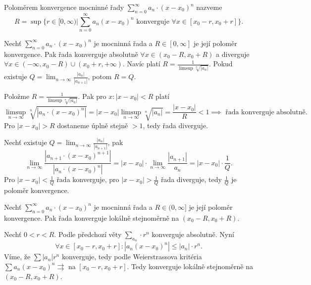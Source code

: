 \documentclass[12pt]{article}					%
\begin{document}
	\begin{definice}
		Poloměrem konvergence mocninné řady $\sum_{n=0}^∞ a_n·(x - x_0)^n$ nazveme
		$$ R = \sup\{r \in [0, ∞) | \sum_{n=0}^∞ a_n (x - x_0)^n \text{ konverguje } \forall x \in [x_0 - r, x_0 + r]\}. $$
	\end{definice}

	\begin{veta}
		Nechť $\sum_{n=0}^∞ a_n·(x - x_0)^n$ je mocninná řada a $R \in [0, ∞]$ je její poloměr konvergence. Pak řada konverguje absolutně $\forall x \in (x_0 - R, x_0 + R)$ a diverguje $\forall x \in (-∞, x_0 - R) \cup (x_0 + r, +∞)$. Navíc platí $R = \frac{1}{\limsup \sqrt[n]{|a_n|}}$. Pokud existuje $Q = \lim_{n \rightarrow ∞} \frac{|a_n|}{|a_{n+1}|}$, potom $R = Q$.

		\begin{dukazin}
			Položme $R = \frac{1}{\limsup \sqrt[n]{|a_n|}}$. Pak pro $x: |x - x_0| < R$ platí
			$$ \limsup_{n \rightarrow ∞} \sqrt[n]{|a_n·(x - x_0)^n|} = |x - x_0| \limsup_{n \rightarrow ∞} \sqrt[n]{|a_n|} = \frac{|x - x_0|}{R} < 1 \implies \text{ řada konverguje absolutně.} $$
			Pro $|x - x_0| > R$ dostaneme úplně stejně $> 1$, tedy řada diverguje.

			Nechť existuje $Q = \lim_{n \rightarrow ∞} \frac{|a_n|}{|a_{n+1}|}$, pak
			$$ \lim_{n \rightarrow ∞} \frac{|a_{n+1}·(x - x_0)^{n+1}|}{|a_n·(x - x_0)^n|} = |x - x_0|·\lim_{n \rightarrow ∞} \frac{|a_{n+1}|}{a_n} = |x - x_0|·\frac{1}{Q}. $$
			Pro $|x - x_0| < \frac{1}{Q}$ řada konverguje, pro $|x - x_0| > \frac{1}{Q}$ řada diverguje, tedy $\frac{1}{Q}$ je poloměr konvergence.
		\end{dukazin}
	\end{veta}

	\begin{veta}
		Nechť $\sum_{n=0}^∞ a_n·(x - x_0)^n$ je mocninná řada a $R \in (0, ∞]$ je její poloměr konvergence. Pak řada konverguje lokálně stejnoměrně na $(x_0 - R, x_0 + R)$.

		\begin{dukazin}
			Nechť $0 < r < R$. Podle předchozí věty $\sum_{a_n}·r^n$ konverguje absolutně. Nyní
			$$ \forall x \in [x_0 - r, x_0 + r]: |a_n(x - x_0)^n| ≤ |a_n|·r^n. $$
			Víme, že $\sum |a_n| r^n$ konverguje, tedy podle Weierstrassova kritéria $\sum a_n(x - x_0)^n \rightrightarrows$ na $[x_0 - r, x_0 + r]$. Tedy konverguje lokálně stejnoměrně na $(x_0 - R, x_0 + R)$.
		\end{dukazin}
	\end{veta}
\end{document}
